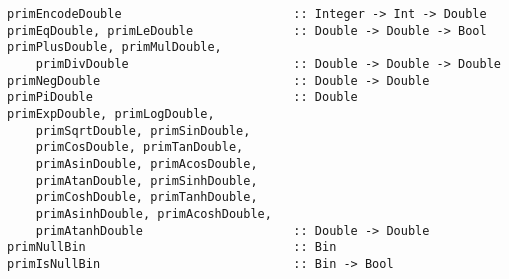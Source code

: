 \mbox{\tt primEncodeDouble\ \ \ \ \ \ \ \ \ \ \ \ \ \ \ \ \ \ \ \ \ \ \ \ ::\ Integer\ ->\ Int\ ->\ Double}\\
\mbox{\tt primEqDouble,\ primLeDouble\ \ \ \ \ \ \ \ \ \ \ \ \ \ ::\ Double\ ->\ Double\ ->\ Bool}\\
\mbox{\tt primPlusDouble,\ primMulDouble,}\\
\mbox{\tt \ \ \ \ primDivDouble\ \ \ \ \ \ \ \ \ \ \ \ \ \ \ \ \ \ \ \ \ \ \ ::\ Double\ ->\ Double\ ->\ Double}\\
\mbox{\tt primNegDouble\ \ \ \ \ \ \ \ \ \ \ \ \ \ \ \ \ \ \ \ \ \ \ \ \ \ \ ::\ Double\ ->\ Double}\\
\mbox{\tt primPiDouble\ \ \ \ \ \ \ \ \ \ \ \ \ \ \ \ \ \ \ \ \ \ \ \ \ \ \ \ ::\ Double}\\
\mbox{\tt primExpDouble,\ primLogDouble,}\\
\mbox{\tt \ \ \ \ primSqrtDouble,\ primSinDouble,}\\
\mbox{\tt \ \ \ \ primCosDouble,\ primTanDouble,}\\
\mbox{\tt \ \ \ \ primAsinDouble,\ primAcosDouble,}\\
\mbox{\tt \ \ \ \ primAtanDouble,\ primSinhDouble,}\\
\mbox{\tt \ \ \ \ primCoshDouble,\ primTanhDouble,}\\
\mbox{\tt \ \ \ \ primAsinhDouble,\ primAcoshDouble,}\\
\mbox{\tt \ \ \ \ primAtanhDouble\ \ \ \ \ \ \ \ \ \ \ \ \ \ \ \ \ \ \ \ \ ::\ Double\ ->\ Double}
\eprogB\noindent\bprogB
\mbox{\tt primNullBin\ \ \ \ \ \ \ \ \ \ \ \ \ \ \ \ \ \ \ \ \ \ \ \ \ \ \ \ \ ::\ Bin}\\
\mbox{\tt primIsNullBin\ \ \ \ \ \ \ \ \ \ \ \ \ \ \ \ \ \ \ \ \ \ \ \ \ \ \ ::\ Bin\ ->\ Bool}
\eprogB
